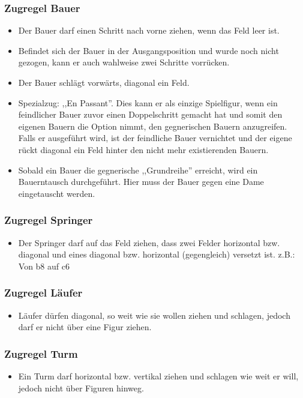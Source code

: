 \documentclass[12pt,a4paper]{article}
\begin{document}
{\subsubsection{Zugregel Bauer}
\label{SUBSUBSEC:PAWN}
\begin{itemize}
	\item{Der Bauer darf einen Schritt nach vorne ziehen, wenn das Feld leer ist.}
	\item{Befindet sich der Bauer in der Ausgangsposition und wurde noch nicht gezogen, kann er auch wahlweise zwei Schritte vorrücken.}
	\item{Der Bauer schlägt vorwärts, diagonal ein Feld.}
	\item{Spezialzug: ,,En Passant''. Dies kann er als einzige Spielfigur, wenn ein feindlicher Bauer zuvor einen Doppelschritt gemacht hat und somit den eigenen Bauern die Option nimmt, den gegnerischen Bauern anzugreifen. Falls er ausgeführt wird, ist der feindliche Bauer vernichtet und der eigene rückt diagonal ein Feld hinter den nicht mehr existierenden Bauern.}
	\item{Sobald ein Bauer die gegnerische ,,Grundreihe'' erreicht, wird ein Bauerntausch durchgeführt. Hier muss der Bauer gegen eine Dame eingetauscht werden.}
\end{itemize}

\subsubsection{Zugregel Springer}
\label{SUBSUBSEC:JUMPER}
\begin{itemize}
	\item{Der Springer darf auf das Feld ziehen, dass zwei Felder horizontal bzw. diagonal und eines diagonal bzw. horizontal (gegengleich) versetzt ist. z.B.: Von  b8 auf c6}
\end{itemize}
\subsubsection{Zugregel Läufer}
\label{SUBSUBSEC:BISHOP}
\begin{itemize}
	\item{Läufer dürfen diagonal, so weit wie sie wollen ziehen und schlagen, jedoch darf er nicht über eine Figur ziehen.}
\end{itemize}

\subsubsection{Zugregel Turm}
\label{SUBSUBSEC:ROOK}
\begin{itemize}
	\item{Ein Turm darf horizontal bzw. vertikal ziehen und schlagen wie weit er will, jedoch nicht über Figuren hinweg.}
\end{itemize}

}
\end{document}
